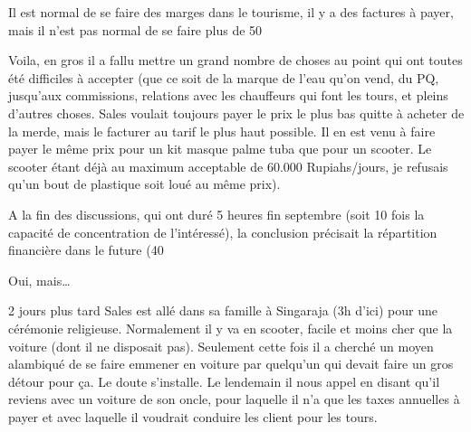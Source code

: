 Il est normal de se faire des marges dans le tourisme, il y a des factures à payer, mais il n’est pas normal de se faire plus de 50%

Voila, en gros il a fallu mettre un grand nombre de choses au point qui ont toutes été difficiles à accepter (que ce soit de la marque de l’eau qu’on vend, du PQ, jusqu’aux commissions, relations avec les chauffeurs qui font les tours, et pleins d’autres choses. Sales voulait toujours payer le prix le plus bas quitte à acheter de la merde, mais le facturer au tarif le plus haut possible. Il en est venu à faire payer le même prix pour un kit masque palme tuba que pour un scooter. Le scooter étant déjà au maximum acceptable de 60.000 Rupiahs/jours, je refusais qu’un bout de plastique soit loué au même prix).

A la fin des discussions, qui ont duré 5 heures fin septembre (soit 10 fois la capacité de concentration de l’intéressé), la conclusion précisait la répartition financière dans le future (40%

Oui, mais…

2 jours plus tard Sales est allé dans sa famille à Singaraja (3h d’ici) pour une cérémonie religieuse. Normalement il y va en scooter, facile et moins cher que la voiture (dont il ne disposait pas). Seulement cette fois il a cherché un moyen alambiqué de se faire emmener en voiture par quelqu’un qui devait faire un gros détour pour ça. Le doute s’installe. Le lendemain il nous appel en disant qu’il reviens avec un voiture de son oncle, pour laquelle il n’a que les taxes annuelles à payer et avec laquelle il voudrait conduire les client pour les tours.

